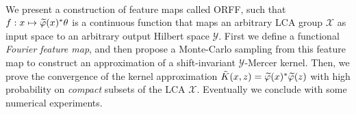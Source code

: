\documentclass[twoside,11pt]{article}
\begin{document}
\paragraph{}
We present a construction of feature maps called \acf{ORFF}, such that $f:
x\mapsto \tildePhi{\omega}(x)^\adjoint \theta$ is a continuous function that
maps an arbitrary \acs{LCA} group $\mathcal{X}$ as input space to an arbitrary
output Hilbert space $\mathcal{Y}$. First we define a functional \emph{Fourier
feature map}, and then propose a Monte-Carlo sampling from this feature map to
construct an approximation of a shift-invariant $\mathcal{Y}$-Mercer kernel.
Then, we prove the convergence of the kernel approximation
$\tilde{K}(x,z)=\tildePhi{\omega}(x)^\adjoint \tildePhi{\omega}(z)$ with high
probability on \emph{compact} subsets of the \acs{LCA} $\mathcal{X}$.
Eventually we conclude with some numerical experiments.
\end{document}
